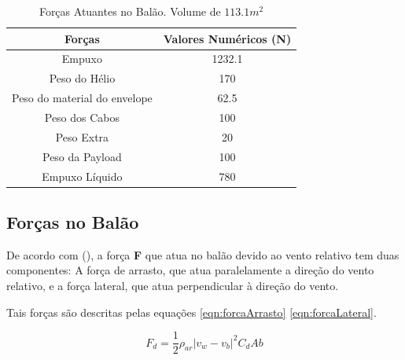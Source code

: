 \begin{table}[htp]
	\centering
	\caption[Forças Atuantes no Balão]{Forças Atuantes no Balão. Volume de $113.1 m^2$}
	\begin{tabular}{|c|c|}
		\hline
		\rowcolor[HTML]{FFFFFF}
		{\color[HTML]{000000} \textbf{Forças}} & {\color[HTML]{000000} \textbf{Valores Numéricos (N)}} \\ \hline
		Empuxo                                 & 1232.1                                                \\ \hline
		Peso do Hélio                          & 170                                                   \\ \hline
		Peso do material do envelope           & 62.5                                                  \\ \hline
		Peso dos Cabos                         & 100                                                   \\ \hline
		Peso Extra                             & 20                                                    \\ \hline
		Peso da Payload                        & 100                                                   \\ \hline
		Empuxo Líquido                         & 780                                                   \\ \hline
	\end{tabular}
	\label{tab:forcasAtuantes}
\end{table}


\subsection{Forças no Balão} %
\label{sub:for_as_no_bal_o}

De acordo com  (\citeyear{yajima}), a força \textbf{F} que atua no balão devido ao vento relativo tem duas componentes: A força de arrasto, que atua paralelamente a direção do vento relativo, e a força lateral, que atua perpendicular à direção do vento.

Tais forças são descritas pelas equações \eqref{eqn:forcaArrasto} \eqref{eqn:forcaLateral}.

	\begin{equacao}
	\caption[Força de arrasto]{Força de Arrasto~\cite{yajima}}
		\begin{equation}
			F_{d} = \frac{1}{2} \rho_{ar} \left | v_{w} - v_{b} \right |^{2} C_{d}A{b}
		\end{equation}
		\label{eqn:forcaArrasto}
	\end{equacao}

